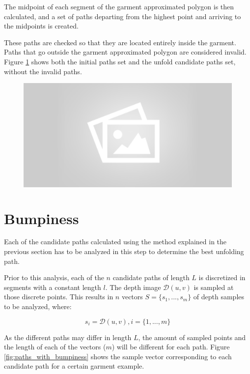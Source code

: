 The midpoint of each segment of the garment approximated polygon is then calculated, and a set of paths departing from the highest point and arriving to the midpoints is created.

These paths are checked so that they are located entirely inside the garment. Paths that go outside the garment approximated polygon are considered invalid. Figure \ref{fig:candidate_paths} shows both the initial paths set and the unfold candidate paths set, without the invalid paths.

\begin{figure}[thpb]
    \centering
    \includegraphics[width=0.7
    \textwidth]{figures/placeholder2.png}
    \caption{}
    \label{fig:candidate_paths}
\end{figure}

\section{Bumpiness}
\label{bumpiness}
Each of the candidate paths calculated using the method explained in the previous section has to be analyzed in this step to determine the best unfolding path. 

Prior to this analysis, each of the $n$ candidate paths of length $L$ is discretized in segments with a constant length $l$. The depth image $\mathcal{D}(u,v)$ is sampled at those discrete points. This results in $n$ vectors $S=\{s_1,...,s_m\}$ of depth samples to be analyzed, where:

\begin{equation}
s_i = \mathcal{D}(u,v), i=\{1,...,m\}

\end{equation}


As the different paths may differ in length $L$, the amount of sampled points and the length of each of the vectors ($m$) will be different for each path. Figure \ref{fig:paths_with_bumpiness} shows the sample vector corresponding to each candidate path for a certain garment example.



